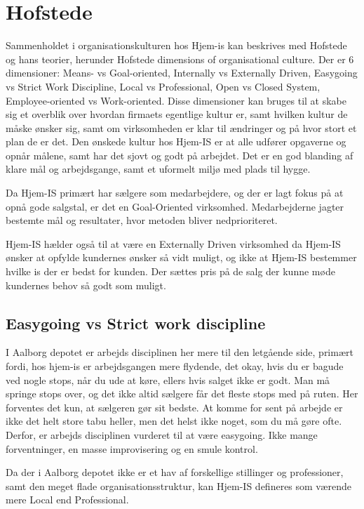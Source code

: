 \section{Hofstede}
Sammenholdet i organisationskulturen hos Hjem-is kan beskrives med Hofstede og hans teorier, herunder Hofstede dimensions of organisational culture. Der er 6 dimensioner: Means- vs Goal-oriented, Internally vs Externally Driven, Easygoing vs Strict Work Discipline, Local vs Professional, Open vs Closed System, Employee-oriented vs Work-oriented\cite{Quickbase}. Disse dimensioner kan bruges til at skabe sig et overblik over hvordan firmaets egentlige kultur er, samt hvilken kultur de måske ønsker sig, samt om virksomheden er klar til ændringer og på hvor stort et plan de er det. Den ønskede kultur hos Hjem-IS er at alle udfører opgaverne og opnår målene, samt har det sjovt og godt på arbejdet. Det er en god blanding af klare mål og arbejdsgange, samt et uformelt miljø med plads til hygge.

Da Hjem-IS primært har sælgere som medarbejdere, og der er lagt fokus på at opnå gode salgstal, er det en Goal-Oriented virksomhed. Medarbejderne jagter bestemte mål og resultater, hvor metoden bliver nedprioriteret.

Hjem-IS hælder også til at være en Externally Driven virksomhed da Hjem-IS ønsker at opfylde kundernes ønsker så vidt muligt, og ikke at Hjem-IS bestemmer hvilke is der er bedst for kunden. Der sættes pris på de salg der kunne møde kundernes behov så godt som muligt.

\subsection{Easygoing vs Strict work discipline}
I Aalborg depotet er arbejds disciplinen her mere til den letgående side, primært fordi, hos hjem-is er arbejdsgangen mere flydende, det okay, hvis du er bagude ved nogle stops, når du ude at køre, ellers hvis salget ikke er godt. Man må springe stops over, og det ikke altid sælgere får det fleste stops med på ruten. Her forventes det kun, at sælgeren gør sit bedste. At komme for sent på arbejde er ikke det helt store tabu heller, men det helst ikke noget, som du må gøre ofte. Derfor, er arbejds disciplinen vurderet til at være easygoing. Ikke mange forventninger, en masse improvisering og en smule kontrol.

Da der i Aalborg depotet ikke er et hav af forskellige stillinger og professioner, samt den meget flade organisationsstruktur, kan Hjem-IS defineres som værende mere Local end Professional.

